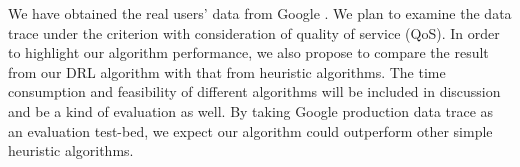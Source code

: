 \documentclass{article}
\begin{document}
We have obtained the real users' data from Google \cite{clusterdata:Reiss2011}. We plan to examine the data trace under the criterion with consideration of quality of service (QoS). In order to highlight our algorithm performance, we also propose to compare the result from our DRL algorithm with that from heuristic algorithms. The time consumption and feasibility of different algorithms will be included in discussion and be a kind of evaluation as well. By taking Google production data trace as an evaluation test-bed, we expect our algorithm could outperform other simple heuristic algorithms.



\end{document}
